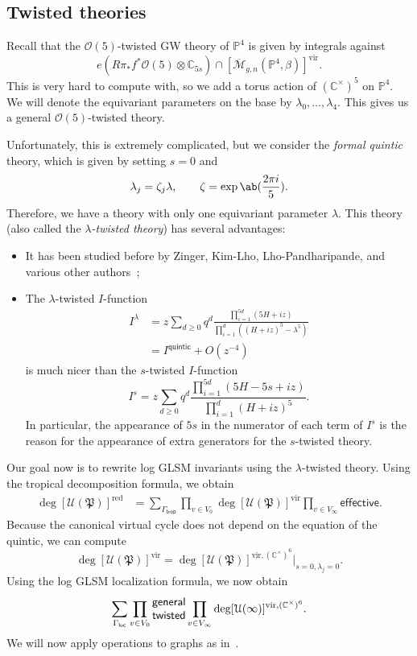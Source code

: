 \documentclass[10pt,oldfontcommands,oneside]{memoir}
\theoremstyle{definition}
\theoremstyle{remark}
\theoremstyle{plain}
\theoremstyle{definition}
\theoremstyle{remark}
\newcommand{\C}{\mathbb{C}}
\renewcommand{\P}{\mathbb{P}}
\newcommand{\Mbar}{\overline{\mathcal{M}}}
\newcommand{\mc}[1]{\mathcal{#1}}
\newcommand{\mf}[1]{\mathfrak{#1}}
\newcommand{\mr}[1]{\mathrm{#1}}
\newcommand{\ms}[1]{\mathsf{#1}}
\newcommand{\1}{\mathbf{1}}
\newcommand{\2}{\mathbf{2}}
\newcommand{\3}{\mathbf{3}}
\newcommand{\vir}{\mr{vir}}
\newcommand{\red}{\mr{red}}
\begin{document}
\subsection{Twisted theories}%
\label{sub:Twisted theory}

Recall that the $\mc{O}(5)$-twisted GW theory of $\P^4$ is given by integrals against
\[ e(R\pi_* f^* \mc{O}(5) \otimes \C_{5s}) \cap [\Mbar_{g,n}(\P^4, \beta)]^{\vir}. \]
This is very hard to compute with, so we add a torus action of $(\C^{\times})^5$ on $\P^4$. We will denote the equivariant parameters on the base by $\lambda_0, \ldots, \lambda_4$. This gives us a general $\mc{O}(5)$-twisted theory.

Unfortunately, this is extremely complicated, but we consider the \textit{formal quintic} theory, which is given by setting $s=0$ and
\[ \lambda_j = \zeta_j \lambda, \qquad \zeta = \exp\ab(\frac{2\pi i}{5}). \]
Therefore, we have a theory with only one equivariant parameter $\lambda$. This theory (also called the \textit{$\lambda$-twisted theory}) has several advantages:
\begin{itemize}
    \item It has been studied before by Zinger, Kim-Lho, Lho-Pandharipande, and various other authors~\cite{reducedgenus1,kimlho,sqhae};
    \item The $\lambda$-twisted $I$-function
        \begin{align*}
            I^{\lambda}&=  z \sum_{d \geq 0} q^d \frac{\prod_{i=1}^{5d} (5H+iz)}{\prod_{i=1}^d ((H+iz)^5 - \lambda^5)} \\
            &= I^{\ms{quintic}} + O(z^{-4})
        \end{align*}
        is much nicer than the $s$-twisted $I$-function
        \[ I^{s}=  z \sum_{d \geq 0} q^d \frac{\prod_{i=1}^{5d} (5H - 5s+iz)}{\prod_{i=1}^d (H+iz)^5}. \]
        In particular, the appearance of $5s$ in the numerator of each term of $I^s$ is the reason for the appearance of extra generators for the $s$-twisted theory.
\end{itemize}

Our goal now is to rewrite log GLSM invariants using the $\lambda$-twisted theory. Using the tropical decomposition formula, we obtain
\begin{align*}
    \deg [\mc{U}(\mf{P})]^{\red} &= \sum_{\Gamma_{\ms{trop}}} \prod_{v \in V_0} \deg [\mc{U}(\mf{P})]^{\vir} \prod_{v \in V_{\infty}} \ms{effective}.
\end{align*}
Because the canonical virtual cycle does not depend on the equation of the quintic, we can compute
\[ \deg [\mc{U}(\mf{P})]^{\vir} = \deg [\mc{U}(\mf{P})]^{\vir, (\C^{\times})^6} |_{s=0,\lambda_j = 0}. \]
Using the log GLSM localization formula, we now obtain
\[ \sum_{\Gamma_{\ms{loc}}} \prod_{v \in V_0} \Centerstack{\textsf{general} \textsf{twisted}} \prod_{v \in V_{\infty}} \deg [\mc{U}(\infty)]^{\vir, (\C^{\times})^6}. \]
We will now apply operations to graphs as in~.
\end{document}

